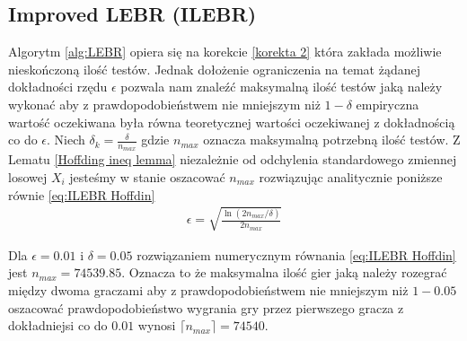 \documentclass[inzynierska]{pwr_wmat_praca_dyplomowa}
\theoremstyle{plain}
\numberwithin{theorem}{chapter}
\theoremstyle{definition}
\numberwithin{theorem}{chapter}
\begin{document}
	\subsection{Improved LEBR (ILEBR)}
	Algorytm \ref{alg:LEBR} opiera się na korekcie \ref{korekta 2} która zakłada możliwie nieskończoną ilość testów. Jednak dołożenie ograniczenia na temat żądanej dokładności rzędu $\epsilon$ pozwala nam znaleźć maksymalną ilość testów jaką należy wykonać aby z prawdopodobieństwem nie mniejszym niż $1-\delta$ empiryczna wartość oczekiwana była równa teoretycznej wartości oczekiwanej z dokładnością co do $\epsilon$. Niech $\delta_k = \frac{\delta}{n_{max}}$ gdzie $n_{max}$ oznacza maksymalną potrzebną ilość testów. Z Lematu \ref{Hoffding ineq lemma} niezależnie od odchylenia standardowego zmiennej losowej $X_i$ jesteśmy w stanie oszacować $n_{max}$ rozwiązując analitycznie poniższe równie \ref{eq:ILEBR Hoffdin}
	\begin{gather}
		\label{eq:ILEBR Hoffdin}
		\epsilon =  \sqrt{\frac{\ln(2n_{max}/\delta)}{2n_{max}}} 
	\end{gather}

	Dla $\epsilon=0.01$ i $\delta=0.05$ rozwiązaniem numerycznym równania \ref{eq:ILEBR Hoffdin} jest $n_{max}=74539.85$.
	Oznacza to że maksymalna ilość gier jaką  należy rozegrać między dwoma graczami aby z prawdopodobieństwem nie mniejszym niż $1-0.05$ oszacować prawdopodobieństwo wygrania gry przez pierwszego gracza z dokładniejsi co do $0.01$ wynosi $\lceil n_{max} \rceil = 74540$. 
	   
\end{document}
